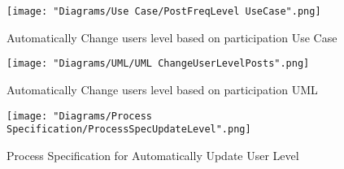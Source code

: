\documentclass[12pt]{article}
\begin{document}
\begin{enumerate}
\begin{enumerate}
  \end{enumerate}
\begin{figure}[h]
	\centering
	\texttt{[image: "Diagrams/Use Case/PostFreqLevel UseCase".png]}
	\caption{Automatically Change users level based on participation Use Case}
\end{figure}
\begin{figure}[h]
	\centering
	\texttt{[image: "Diagrams/UML/UML ChangeUserLevelPosts".png]}
	\caption{Automatically Change users level based on participation UML}
\end{figure}
\begin{figure}[h]
	\centering
	\texttt{[image: "Diagrams/Process Specification/ProcessSpecUpdateLevel".png]}
	\caption{Process Specification for Automatically Update User Level}
\end{figure} \clearpage %


\end{enumerate}
\end{document}
